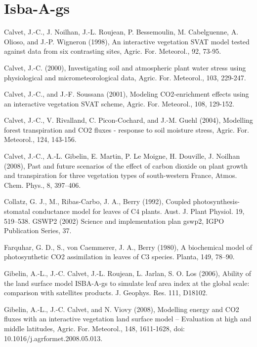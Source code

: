 \section{Isba-A-gs}
\begin{description}

\item
Calvet, J.-C., J. Noilhan, J.-L. Roujean, P. Bessemoulin, M. Cabelguenne, A. Olioso, and J.-P.
Wigneron (1998), An interactive vegetation SVAT model tested against data from six contrasting
sites, Agric. For. Meteorol., 92, 73-95.
\item
Calvet, J.-C. (2000), Investigating soil and atmospheric plant water stress using physiological and
micrometeorological data, Agric. For. Meteorol., 103, 229-247.
\item
Calvet, J.-C., and J.-F. Soussana (2001), Modeling CO2-enrichment effects using an interactive
vegetation SVAT scheme, Agric. For. Meteorol., 108, 129-152.
\item
Calvet, J.-C., V. Rivalland, C. Picon-Cochard, and J.-M. Guehl (2004), Modelling forest transpiration
and CO2 fluxes - response to soil moisture stress, Agric. For. Meteorol., 124, 143-156.
\item
Calvet, J.-C., A.-L. Gibelin, E. Martin, P. Le Moigne, H. Douville, J. Noilhan (2008), Past and future
scenarios of the effect of carbon dioxide on plant growth and transpiration for three vegetation
types of south-western France, Atmos. Chem. Phys., 8, 397–406.
\item
Collatz, G. J., M., Ribas-Carbo, J. A., Berry (1992), Coupled photosynthesis-stomatal conductance
model for leaves of C4 plants. Aust. J. Plant Physiol. 19, 519–538.
GSWP2 (2002) Science and implementation plan gswp2, IGPO Publication Series, 37.
\item
Farquhar, G. D., S., von Caemmerer, J. A., Berry (1980), A biochemical model of photosynthetic CO2
assimilation in leaves of C3 species. Planta, 149, 78–90.
\item
Gibelin, A.-L., J.-C. Calvet, J.-L. Roujean, L. Jarlan, S. O. Los (2006), Ability of the land surface model
ISBA-A-gs to simulate leaf area index at the global scale: comparison with satellites products.
J. Geophys. Res. 111, D18102.
\item
Gibelin, A.-L., J.-C. Calvet, and N. Viovy (2008), Modelling energy and CO2 fluxes with an interactive
vegetation land surface model – Evaluation at high and middle latitudes, Agric. For. Meteorol.,
148, 1611-1628, doi: 10.1016/j.agrformet.2008.05.013.
\item

\end{description}
